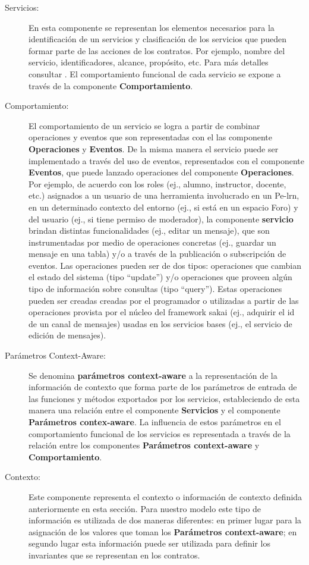 \begin{description}
\item[Servicios:] En esta componente se representan los elementos necesarios para la identificación de un servicios y clasificación de los servicios que pueden formar parte de las acciones de los contratos. Por ejemplo, nombre del servicio, identificadores, alcance, propósito, etc. Para más detalles consultar \cite{libro6}. El comportamiento funcional de cada servicio se expone a través de la componente \textbf{Comportamiento}.

\item[Comportamiento:] El comportamiento de un servicio se logra a partir de combinar operaciones y eventos que son representadas con el las componente \textbf{Operaciones} y \textbf{Eventos}. De la misma manera el servicio puede ser implementado a través del uso de eventos, representados con el componente \textbf{Eventos}, que puede lanzado operaciones del componente \textbf{Operaciones}. Por ejemplo, de acuerdo con los roles (ej., alumno, instructor, docente, etc.) asignados a un usuario de una herramienta involucrado en un Pe-lrn, en un determinado contexto del entorno (ej., si está en un espacio Foro) y del usuario (ej., si tiene permiso de moderador), la componente \textbf{servicio} brindan distintas funcionalidades (ej., editar un mensaje), que son instrumentadas por medio de operaciones concretas (ej., guardar un mensaje en una tabla) y/o a través de la publicación o subscripción de eventos. Las operaciones pueden ser de dos tipos: operaciones
que cambian el estado del sistema (tipo “update”) y/o operaciones que
proveen algún tipo de información sobre consultas  (tipo “query”). Estas operaciones pueden ser creadas creadas por el programador o utilizadas a partir de las operaciones provista por el núcleo del framework sakai (ej., adquirir el id de un canal de mensajes) usadas en los servicios bases (ej., el servicio de edición de mensajes). 

\item [Parámetros Context-Aware:] Se denomina \textbf{parámetros context-aware} a la representación de la información de contexto que forma parte de los parámetros de entrada de las funciones y métodos exportados por los servicios, estableciendo de esta manera una relación entre el componente \textbf{Servicios} y el componente \textbf{Parámetros contex-aware}. La influencia de estos parámetros en el comportamiento funcional de los servicios es representada a través de la relación entre los componentes \textbf{Parámetros context-aware} y  \textbf{Comportamiento}. 

\item[Contexto:] Este componente representa el contexto o información de contexto definida anteriormente en esta sección. Para nuestro modelo este tipo de información es utilizada de dos maneras diferentes: en primer lugar para la asignación de los valores que toman los \textbf{Parámetros context-aware}; en segundo lugar esta información puede ser utilizada para definir los invariantes que se representan en los contratos.
\end{description}



